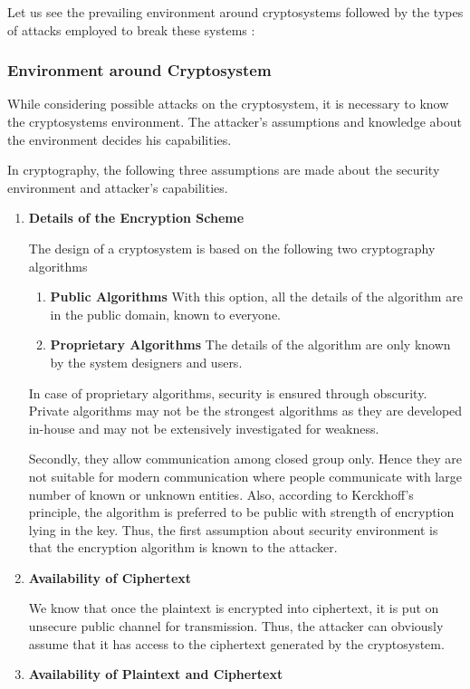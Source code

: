 \documentclass[british]{article}
\begin{document}
Let us see the prevailing environment around cryptosystems followed
by the types of attacks employed to break these systems :

\subsubsection{Environment around Cryptosystem}

While considering possible attacks on the cryptosystem, it is necessary
to know the cryptosystems environment. The attacker's assumptions
and knowledge about the environment decides his capabilities.

In cryptography, the following three assumptions are made about the
security environment and attacker's capabilities.
\begin{enumerate}
\item \textbf{Details of the Encryption Scheme}

The design of a cryptosystem is based on the following two cryptography
algorithms \textminus{}
\begin{enumerate}
\item \textbf{Public Algorithms \textminus{}} With this option, all the
details of the algorithm are in the public domain, known to everyone.
\item \textbf{Proprietary Algorithms \textminus{} }The details of the algorithm
are only known by the system designers and users.
\end{enumerate}
In case of proprietary algorithms, security is ensured through obscurity.
Private algorithms may not be the strongest algorithms as they are
developed in-house and may not be extensively investigated for weakness.

\noindent Secondly, they allow communication among closed group only.
Hence they are not suitable for modern communication where people
communicate with large number of known or unknown entities. Also,
according to Kerckhoff's principle, the algorithm is preferred to
be public with strength of encryption lying in the key. Thus, the
first assumption about security environment is that the encryption
algorithm is known to the attacker.
\item \textbf{Availability of Ciphertext}

We know that once the plaintext is encrypted into ciphertext, it is
put on unsecure public channel for transmission. Thus, the attacker
can obviously assume that it has access to the ciphertext generated
by the cryptosystem.
\item \textbf{Availability of Plaintext and Ciphertext}


\end{enumerate}
\end{document}
